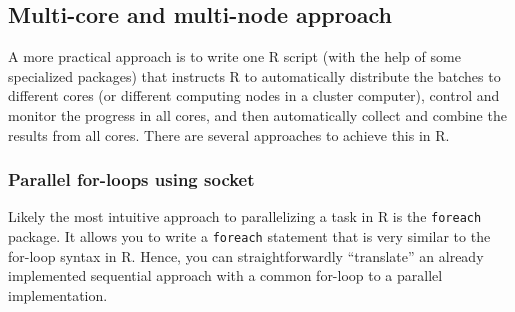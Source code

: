 \documentclass[
  12pt,
]{style/krantz}
\begin{document}
\hypertarget{multi-core-and-multi-node-approach}{%
\subsection{Multi-core and multi-node approach}\label{multi-core-and-multi-node-approach}}

A more practical approach is to write one R script (with the help of some specialized packages) that instructs R to automatically distribute the batches to different cores (or different computing nodes in a cluster computer), control and monitor the progress in all cores, and then automatically collect and combine the results from all cores. There are several approaches to achieve this in R.

\hypertarget{parallel-for-loops-using-socket}{%
\subsubsection{Parallel for-loops using socket}\label{parallel-for-loops-using-socket}}

Likely the most intuitive approach to parallelizing a task in R is the \texttt{foreach} package. It allows you to write a \texttt{foreach} statement that is very similar to the for-loop syntax in R. Hence, you can straightforwardly ``translate'' an already implemented sequential approach with a common for-loop to a parallel implementation.
\end{document}

